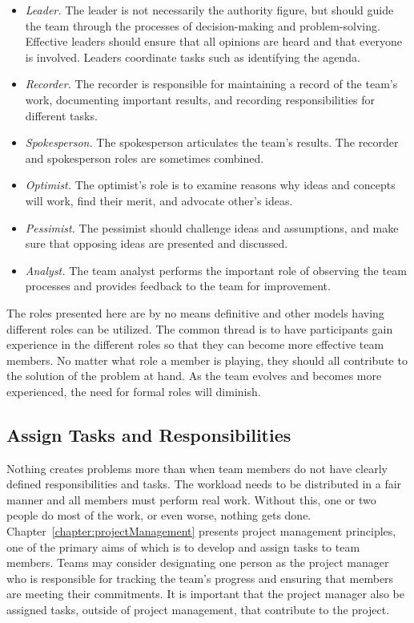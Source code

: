 \begin{itemize}
\item
  \emph{Leader.} The leader is not necessarily the authority figure, but
  should guide the team through the processes of decision-making and
  problem-solving. Effective leaders should ensure that all opinions are
  heard and that everyone is involved. Leaders coordinate tasks such as
  identifying the agenda.
\item
  \emph{Recorder.} The recorder is responsible for maintaining a record
  of the team's work, documenting important results, and recording
  responsibilities for different tasks.
\item
  \emph{Spokesperson.} The spokesperson articulates the team's results.
  The recorder and spokesperson roles are sometimes combined.
\item
  \emph{Optimist.} The optimist's role is to examine reasons why ideas
  and concepts will work, find their merit, and advocate other's ideas.
\item
  \emph{Pessimist.} The pessimist should challenge ideas and
  assumptions, and make sure that opposing ideas are presented and
  discussed.
\item
  \emph{Analyst.} The team analyst performs the important role of
  observing the team processes and provides feedback to the team for
  improvement.
\end{itemize}

The roles presented here are by no means definitive and other models
having different roles can be utilized. The common thread is to have
participants gain experience in the different roles so that they can
become more effective team members. No matter what role a member is
playing, they should all contribute to the solution of the problem at
hand. As the team evolves and becomes more experienced, the need for
formal roles will diminish.

\subsection{Assign Tasks and Responsibilities}
\label{subsection:assign-tasks-and-responsibilities}

Nothing creates problems more than when team members do not have clearly
defined responsibilities and tasks. The workload needs to be distributed
in a fair manner and all members must perform real work. Without this,
one or two people do most of the work, or even worse, nothing gets done.
Chapter~\ref{chapter:projectManagement} presents project management 
principles, one of the primary
aims of which is to develop and assign tasks to team members. Teams may
consider designating one person as the project manager who is
responsible for tracking the team's progress and ensuring that members
are meeting their commitments. It is important that the project manager
also be assigned tasks, outside of project management, that contribute
to the project.

